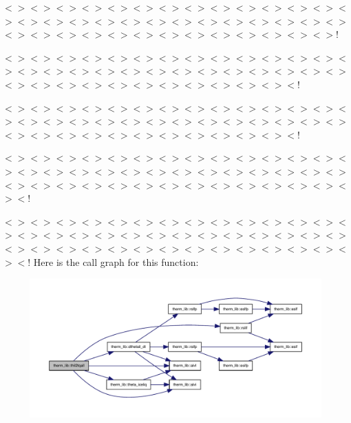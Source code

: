 $<$$>$$<$$>$$<$$>$$<$$>$$<$$>$$<$$>$$<$$>$$<$$>$$<$$>$$<$$>$$<$$>$$<$$>$$<$$>$$<$$>$$<$$>$$<$$>$$<$$>$$<$$>$$<$$>$$<$$>$$<$$>$$<$$>$$<$$>$$<$$>$$<$$>$$<$$>$$<$$>$$<$$>$$<$$>$$<$$>$$<$$>$$<$$>$$<$$>$$<$$>$$<$$>$$<$$>$$<$$>$$<$$>$$<$$>$$<$$>$!

$<$$>$$<$$>$$<$$>$$<$$>$$<$$>$$<$$>$$<$$>$$<$$>$$<$$>$$<$$>$$<$$>$$<$$>$$<$$>$$<$$>$$<$$>$$<$$>$$<$$>$$<$$>$$<$$>$$<$$>$$<$$>$$<$$>$$<$$>$$<$$>$$<$$>$$<$$>$$<$$>$$<$$>$$<$$>$$<$$>$$<$$>$$<$$>$$<$$>$$<$$>$$<$$>$$<$$>$$<$$>$$<$$>$$<$!

$<$$>$$<$$>$$<$$>$$<$$>$$<$$>$$<$$>$$<$$>$$<$$>$$<$$>$$<$$>$$<$$>$$<$$>$$<$$>$$<$$>$$<$$>$$<$$>$$<$$>$$<$$>$$<$$>$$<$$>$$<$$>$$<$$>$$<$$>$$<$$>$$<$$>$$<$$>$$<$$>$$<$$>$$<$$>$$<$$>$$<$$>$$<$$>$$<$$>$$<$$>$$<$$>$$<$$>$$<$$>$$<$$>$$<$!

$<$$>$$<$$>$$<$$>$$<$$>$$<$$>$$<$$>$$<$$>$$<$$>$$<$$>$$<$$>$$<$$>$$<$$>$$<$$>$$<$$>$$<$$>$$<$$>$$<$$>$$<$$>$$<$$>$$<$$>$$<$$>$$<$$>$$<$$>$$<$$>$$<$$>$$<$$>$$<$$>$$<$$>$$<$$>$$<$$>$$<$$>$$<$$>$$<$$>$$<$$>$$<$$>$$<$$>$$<$$>$$<$$>$$<$$>$$<$$>$$<$$>$$<$!

$<$$>$$<$$>$$<$$>$$<$$>$$<$$>$$<$$>$$<$$>$$<$$>$$<$$>$$<$$>$$<$$>$$<$$>$$<$$>$$<$$>$$<$$>$$<$$>$$<$$>$$<$$>$$<$$>$$<$$>$$<$$>$$<$$>$$<$$>$$<$$>$$<$$>$$<$$>$$<$$>$$<$$>$$<$$>$$<$$>$$<$$>$$<$$>$$<$$>$$<$$>$$<$$>$$<$$>$$<$$>$$<$$>$$<$$>$$<$$>$$<$$>$$<$! Here is the call graph for this function\+:
\nopagebreak
\begin{figure}[H]
\begin{center}
\leavevmode
\includegraphics[width=350pt]{namespacetherm__lib_a8fda8004633d91addcf1c6004df3bd88_cgraph}
\end{center}
\end{figure}
\mbox{\label{namespacetherm__lib_a0285be7469fbc289302f23bd321fce36}} 

